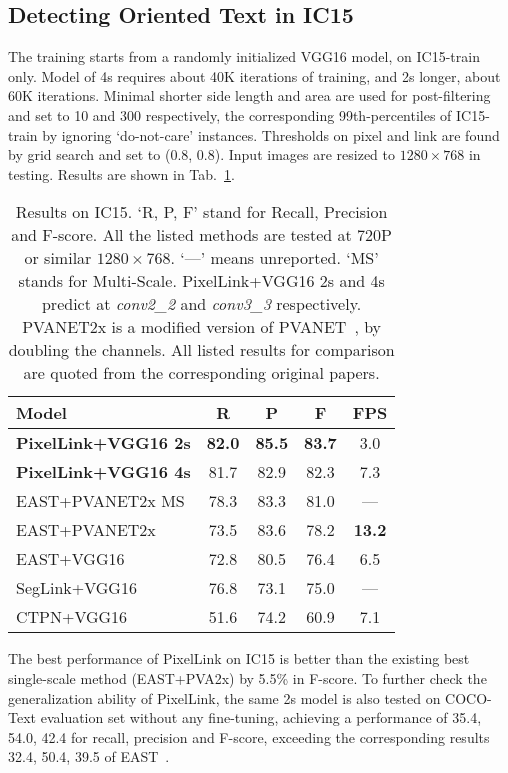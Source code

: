 \documentclass[letterpaper]{article} \usepackage{aaai18}  \usepackage{times}  \usepackage{helvet}  \usepackage{courier}  \usepackage{url}  \usepackage{graphicx}
\begin{document}
	\subsection{Detecting Oriented Text in IC15}
	\label{sec:results-on-ic15}
	The training starts from a randomly initialized VGG16 model, on IC15-train only. Model of 4s requires about 40K iterations of training, and 2s longer, about 60K iterations. Minimal shorter side length and area are used for post-filtering and set to 10 and 300 respectively, the corresponding 99th-percentiles of IC15-train by ignoring `do-not-care' instances. Thresholds on pixel and link are found by grid search and set to (0.8, 0.8). Input images are resized to $1280\times 768$ in testing. Results are shown in \mbox{Tab.~\ref{table:results-on-ic15}}.
	\begin{table}
		\centering
		\caption{Results on IC15.
			`R, P, F' stand for Recall, Precision and F-score. All the listed methods are tested at 720P or similar $1280\times 768$. `---' means unreported. `MS' stands for Multi-Scale. PixelLink+VGG16 2s and 4s predict at \emph{conv2\_2} and  \emph{conv3\_3} respectively. PVANET2x is a modified version of PVANET~\cite{kim2016pvanet}, by doubling the channels. All listed results for comparison are quoted from the corresponding original papers.}
		\label{table:results-on-ic15}
		\begin{tabular}{|l|c|c|c|c|}
			\hline
			Model                   &R      &P      &F      &FPS\\
			\hline
			\hline
			\textbf{PixelLink+VGG16 2s}     &\textbf{82.0}  &\textbf{85.5}  &\textbf{83.7}  &3.0\\
			\hline
			\textbf{PixelLink+VGG16 4s}      &81.7   &82.9  &82.3   &7.3\\
			\hline
			EAST+PVANET2x MS       &78.3   &83.3  &81.0   &---\\
			\hline
			EAST+PVANET2x           &73.5   &83.6  &78.2   &\textbf{13.2}\\
			\hline
			EAST+VGG16              &72.8   &80.5  &76.4   &6.5\\
			\hline
			SegLink+VGG16           &76.8   &73.1  &75.0   &---\\
			\hline
			CTPN+VGG16              &51.6   &74.2  &60.9   &7.1\\
			\hline
		\end{tabular}
	\end{table}
	
	The best performance of PixelLink on IC15 is better than the existing best single-scale method (EAST+PVA2x) by 5.5\% in F-score. To further check the generalization ability of PixelLink, the same 2s model is also tested on COCO-Text evaluation set without any fine-tuning, achieving a performance of 35.4, 54.0, 42.4 for recall, precision and F-score, exceeding the corresponding results 32.4, 50.4, 39.5 of EAST~\cite{Zhou2017EAST}.
	
\end{document}
